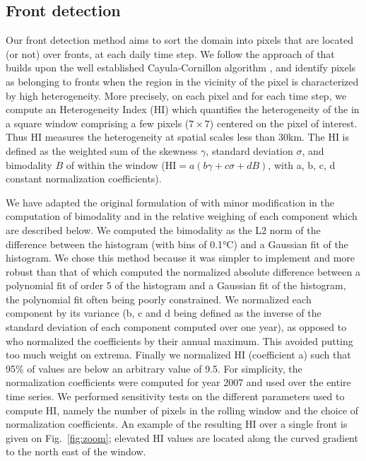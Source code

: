 \subsection{Front detection}

Our front detection method aims to sort the domain into pixels that are located (or not) over fronts, at each daily time step.
We follow the approach of \citet{liu_2016} that builds upon the well established Cayula-Cornillon algorithm \citep{cayula_1992, belkin_2009}, and identify pixels as belonging to fronts when the region in the vicinity of the pixel is characterized by high  heterogeneity.
More precisely, on each pixel and for each time step, we compute an Heterogeneity Index (HI) which quantifies the heterogeneity of the  in a square window comprising a few pixels (\(7 \times 7\)) centered on the pixel of interest.
Thus HI measures the  heterogeneity at spatial scales less than 30km.
The HI is defined as the weighted sum of the skewness \(\gamma\), standard deviation \(\sigma\), and bimodality \(B\) of  within the window (\(\mathrm{HI} = a \left( b \gamma + c \sigma + d B \right)\), with a, b, c, d constant normalization coefficients).

We have adapted the original formulation of \citet{liu_2016} with minor modification in the computation of bimodality and in the relative weighing of each component which are described below.
We computed the bimodality as the L2 norm of the difference between the  histogram (with bins of 0.1°C) and a Gaussian fit of the histogram.
We chose this method because it was simpler to implement and more robust than that of \citet{liu_2016} which computed the normalized absolute difference between a polynomial fit of order 5 of the  histogram and a Gaussian fit of the histogram, the polynomial fit often being poorly constrained.
We normalized each component by its variance (b, c and d being defined as the inverse of the standard deviation of each component computed over one year), as opposed to \citet{liu_2016} who normalized the coefficients by their annual maximum.
This avoided putting too much weight on extrema.
Finally we normalized HI (coefficient a) such that 95\% of values are below an arbitrary value of 9.5.
For simplicity, the normalization coefficients were computed for year 2007 and used over the entire time series.
We performed sensitivity tests on the different parameters used to compute HI, namely the number of pixels in the rolling window and the choice of normalization coefficients.
An example of the resulting HI over a single front is given on Fig.~\ref{fig:zoom}; elevated HI values are located along the curved  gradient to the north east of the window.

